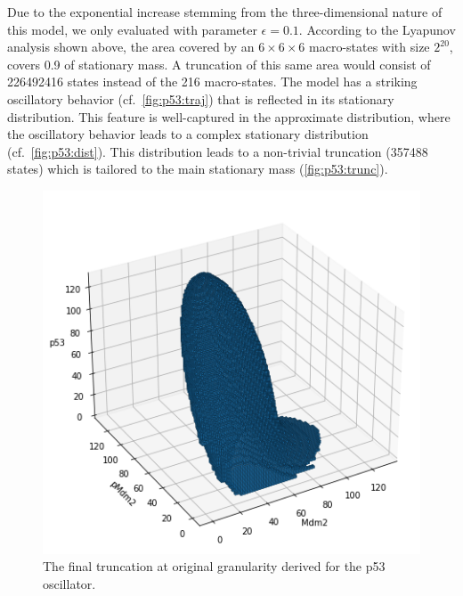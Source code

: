 Due to the exponential increase stemming from the three-dimension\-al nature of this model, we only evaluated with parameter $\epsilon=0.1$.
According to the Lyapunov analysis shown above, the area covered by an $6\times 6\times 6$ macro-states with size $2^{20}$, covers \num{0.9} of stationary mass.
A truncation of this same area would consist of \num{226492416} states instead of the \num{216} macro-states.
The model has a striking oscillatory behavior (cf.\ \autoref{fig:p53:traj}) that is reflected in its stationary distribution.
This feature is well-captured in the approximate distribution, where the oscillatory behavior leads to a complex stationary distribution (cf.\ \autoref{fig:p53:dist}).
This distribution leads to a non-trivial truncation (\num{357488} states) which is tailored to the main stationary mass (\autoref{fig:p53:trunc}).
\begin{figure}[htb]
    \centering
    \begin{minipage}{0.9\textwidth}
    \centering
    \includegraphics[width=\textwidth]{gfx/p53_trunc.png}
    \end{minipage}
\caption{The final truncation at original granularity derived for the p53 oscillator.}
\label{fig:p53:trunc}
\end{figure}
